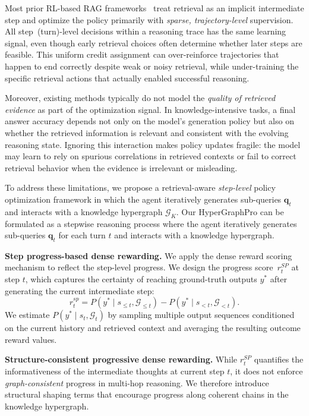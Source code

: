 Most prior RL-based RAG frameworks~\citep{jin2025search,luo2025graph} treat retrieval as an implicit intermediate step and optimize the policy primarily with \emph{sparse, trajectory-level} supervision.
All step~(turn)-level decisions within a reasoning trace has the same learning signal, even though early retrieval choices often determine whether later steps are feasible. 
This uniform credit assignment can over-reinforce trajectories that happen to end correctly despite weak or noisy retrieval, while under-training the specific retrieval actions that actually enabled successful reasoning.

Moreover, existing methods typically do not model the \emph{quality of retrieved evidence} as part of the optimization signal. In knowledge-intensive tasks, a final answer accuracy depends not only on the model’s generation policy but also on whether the retrieved information is relevant and consistent with the evolving reasoning state. Ignoring this interaction makes policy updates fragile: the model may learn to rely on spurious correlations in retrieved contexts or fail to correct retrieval behavior when the evidence is irrelevant or misleading.

To address these limitations, we propose a retrieval-aware \emph{step-level} policy optimization framework in which the agent iteratively generates sub-queries $\boldsymbol{q}_t$ and interacts with a knowledge hypergraph $\mathcal{G}_K$. 
Our HyperGraphPro can be formulated as a stepwise reasoning process where the agent iteratively generates sub-queries $\boldsymbol{q}_t$ for each turn $t$ and interacts with a knowledge hypergraph.

\noindent\textbf{Step progress-based dense rewarding.}
We apply the dense reward scoring mechanism to reflect the step-level progress.
We design the progress score~$r_t^{SP}$ at step $t$, which captures the certainty of reaching ground-truth outputs $y^*$ after generating the current intermediate step:
\begin{equation}
    r_t^{sp}
    = P(y^* \mid s_{\le t}, \mathcal{G}_{\le t}) - P(y^* \mid s_{<t}, \mathcal{G}_{<t}).
\end{equation}
We estimate $P(y^* \mid s_t, \mathcal{G}_t)$ by sampling multiple output sequences conditioned on the current history and retrieved context and averaging the resulting outcome reward values.

\noindent\textbf{Structure-consistent progressive dense rewarding.}
While $r_t^{SP}$ quantifies the informativeness of the intermediate thoughts at current step $t$, it does not enforce \emph{graph-consistent} progress in multi-hop reasoning.
We therefore introduce structural shaping terms that encourage progress along coherent chains in the knowledge hypergraph.

